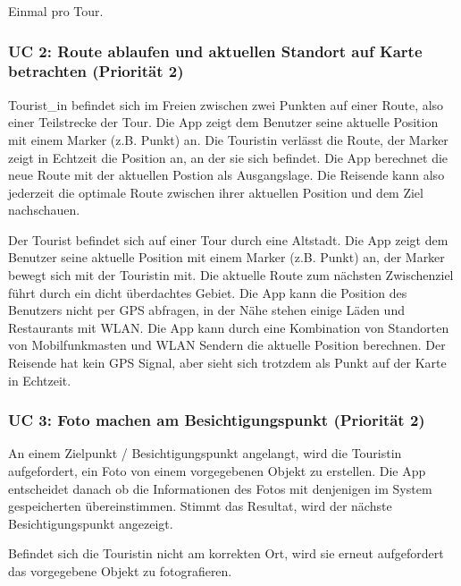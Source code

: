 \label{auftrittshuxe4ufigkeit}
Einmal pro Tour.


\subsubsection{UC 2: Route ablaufen und aktuellen Standort auf Karte betrachten (Priorität 2)}\label{uc-2-user-luxe4uft-route-ab-und-sieht-seine-aktuellen-standort-auf-einer-karte-priorituxe4t-2}
\label{erfolgszenario}
Tourist\_in befindet sich im Freien zwischen zwei Punkten auf einer
Route, also einer Teilstrecke der Tour. Die App zeigt dem Benutzer seine
aktuelle Position mit einem Marker (z.B. Punkt) an. Die Touristin verlässt
die Route, der Marker zeigt in Echtzeit die Position an, an der sie sich
befindet. Die App berechnet die neue Route mit der aktuellen Postion als
Ausgangslage. Die Reisende kann also jederzeit die optimale Route
zwischen ihrer aktuellen Position und dem Ziel nachschauen.


\label{erfolgszenario-mit-fallback}
Der Tourist befindet sich auf einer Tour durch eine Altstadt. Die App
zeigt dem Benutzer seine aktuelle Position mit einem Marker (z.B. Punkt)
an, der Marker bewegt sich mit der Touristin mit. Die aktuelle Route zum
nächsten Zwischenziel führt durch ein dicht überdachtes Gebiet. Die App
kann die Position des Benutzers nicht per GPS abfragen, in der Nähe stehen
einige Läden und Restaurants mit WLAN. Die App kann durch eine
Kombination von Standorten von Mobilfunkmasten und WLAN Sendern die
aktuelle Position berechnen. Der Reisende hat kein GPS Signal, aber
sieht sich trotzdem als Punkt auf der Karte in Echtzeit.


\subsubsection{UC 3: Foto machen am Besichtigungspunkt (Priorität 2)}\label{uc-3-user-macht-foto-am-besichtigungspunkt-priorituxe4t-2}
\label{erfolgszenario-1}
An einem Zielpunkt / Besichtigungspunkt angelangt, wird die Touristin aufgefordert, ein Foto von einem vorgegebenen Objekt zu erstellen. Die
App entscheidet danach ob die Informationen des Fotos mit denjenigen im
System gespeicherten übereinstimmen. Stimmt das Resultat, wird der
nächste Besichtigungspunkt angezeigt.


\label{alternativszenario}
Befindet sich die Touristin nicht am korrekten Ort, wird sie erneut
aufgefordert das vorgegebene Objekt zu fotografieren.


